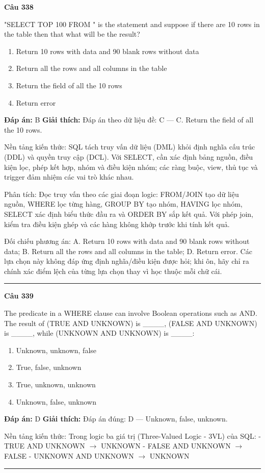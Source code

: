 \documentclass[11pt,a4paper]{article}
\newenvironment{question}[1]{%
  \par\vspace{1em}\noindent\textbf{\large Câu #1}\par\vspace{0.4em}
}{%
  \par\vspace{1em}\hrule\vspace{0.6em}
}
\newenvironment{choices}{%
  \begin{enumerate}[label=\textbf{\Alph*.},leftmargin=2.2em,itemsep=2pt,topsep=3pt]
}{%
  \end{enumerate}
}
\newcommand{\choice}{\item}
\begin{document}
\begin{question}{338}
"SELECT TOP 100  FROM  " is the statement and suppose if there are 10 rows in the table then that what will be the result?
\begin{choices}
\choice Return 10 rows with data and 90 blank rows without data
\choice Return all the rows and all columns in the table
\choice Return the field of all the 10 rows
\choice Return error
\end{choices}
\textbf{Đáp án:} B
\textbf{Giải thích:} Đáp án theo dữ liệu đề: C — C. Return the field of all the 10 rows.

Nền tảng kiến thức: SQL tách truy vấn dữ liệu (DML) khỏi định nghĩa cấu trúc (DDL) và quyền truy cập (DCL). Với SELECT, cần xác định bảng nguồn, điều kiện lọc, phép kết hợp, nhóm và điều kiện nhóm; các ràng buộc, view, thủ tục và trigger đảm nhiệm các vai trò khác nhau.

Phân tích: Đọc truy vấn theo các giai đoạn logic: FROM/JOIN tạo dữ liệu nguồn, WHERE lọc từng hàng, GROUP BY tạo nhóm, HAVING lọc nhóm, SELECT xác định biểu thức đầu ra và ORDER BY sắp kết quả. Với phép join, kiểm tra điều kiện ghép và các hàng không khớp trước khi tính kết quả.

Đối chiếu phương án: A. Return 10 rows with data and 90 blank rows without data; B. Return all the rows and all columns in the table; D. Return error. Các lựa chọn này không đáp ứng định nghĩa/điều kiện được hỏi; khi ôn, hãy chỉ ra chính xác điểm lệch của từng lựa chọn thay vì học thuộc mỗi chữ cái.
\end{question}

\begin{question}{339}
The predicate in a WHERE clause can involve Boolean operations such as AND. The result of (TRUE AND UNKNOWN) is ____, (FALSE AND UNKNOWN) is ____, while (UNKNOWN AND UNKNOWN) is ____:
\begin{choices}
\choice Unknown, unknown, false
\choice True, false, unknown
\choice True, unknown, unknown
\choice Unknown, false, unknown
\end{choices}
\textbf{Đáp án:} D
\textbf{Giải thích:} Đáp án đúng: D — Unknown, false, unknown.

Nền tảng kiến thức: Trong logic ba giá trị (Three-Valued Logic - 3VL) của SQL:
- TRUE AND UNKNOWN $\to$ UNKNOWN
- FALSE AND UNKNOWN $\to$ FALSE
- UNKNOWN AND UNKNOWN $\to$ UNKNOWN
\end{question}
\end{document}

